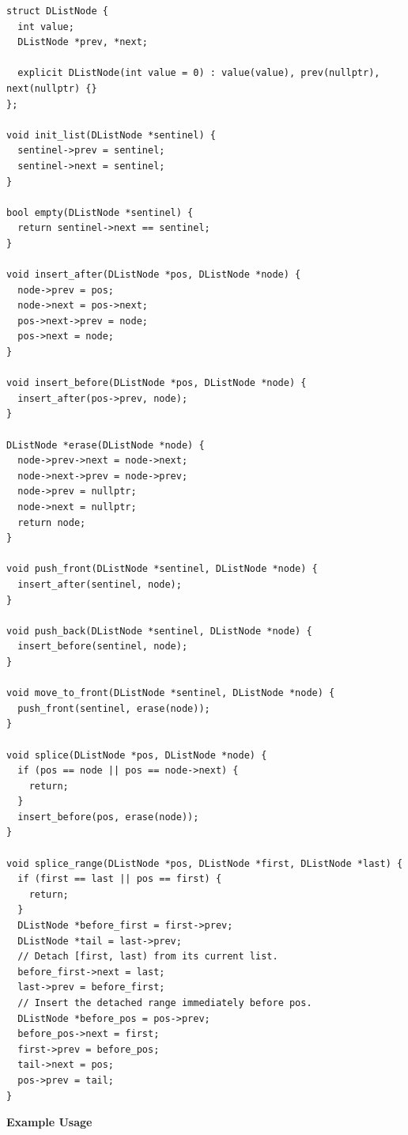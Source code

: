 \begin{lstlisting}[style=cpp]
struct DListNode {
  int value;
  DListNode *prev, *next;

  explicit DListNode(int value = 0) : value(value), prev(nullptr), next(nullptr) {}
};

void init_list(DListNode *sentinel) {
  sentinel->prev = sentinel;
  sentinel->next = sentinel;
}

bool empty(DListNode *sentinel) {
  return sentinel->next == sentinel;
}

void insert_after(DListNode *pos, DListNode *node) {
  node->prev = pos;
  node->next = pos->next;
  pos->next->prev = node;
  pos->next = node;
}

void insert_before(DListNode *pos, DListNode *node) {
  insert_after(pos->prev, node);
}

DListNode *erase(DListNode *node) {
  node->prev->next = node->next;
  node->next->prev = node->prev;
  node->prev = nullptr;
  node->next = nullptr;
  return node;
}

void push_front(DListNode *sentinel, DListNode *node) {
  insert_after(sentinel, node);
}

void push_back(DListNode *sentinel, DListNode *node) {
  insert_before(sentinel, node);
}

void move_to_front(DListNode *sentinel, DListNode *node) {
  push_front(sentinel, erase(node));
}

void splice(DListNode *pos, DListNode *node) {
  if (pos == node || pos == node->next) {
    return;
  }
  insert_before(pos, erase(node));
}

void splice_range(DListNode *pos, DListNode *first, DListNode *last) {
  if (first == last || pos == first) {
    return;
  }
  DListNode *before_first = first->prev;
  DListNode *tail = last->prev;
  // Detach [first, last) from its current list.
  before_first->next = last;
  last->prev = before_first;
  // Insert the detached range immediately before pos.
  DListNode *before_pos = pos->prev;
  before_pos->next = first;
  first->prev = before_pos;
  tail->next = pos;
  pos->prev = tail;
}
\end{lstlisting}
\textbf{Example Usage}\par
